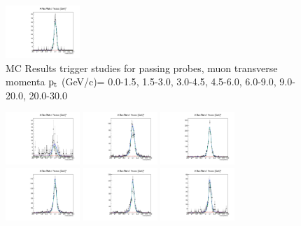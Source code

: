 \documentclass{article}
\begin{document}
\begin{figure}
    \includegraphics[width=0.25\textwidth]{../PlotsRooFitMC/croofit_trk_pass_6.pdf}
    \caption{MC Results trigger studies for passing probes, muon transverse momenta
    $\rm p_{t}$ (GeV/c)= {0.0-1.5}, {1.5-3.0}, {3.0-4.5}, {4.5-6.0}, 
    {6.0-9.0}, {9.0-20.0}, {20.0-30.0}}
\end{figure}

\begin{figure}
    \includegraphics[width=0.25\textwidth]{../PlotsRooFitMC/croofit_trk_fail_0.pdf}
    \includegraphics[width=0.25\textwidth]{../PlotsRooFitMC/croofit_trk_fail_1.pdf}
    \includegraphics[width=0.25\textwidth]{../PlotsRooFitMC/croofit_trk_fail_2.pdf}
    \includegraphics[width=0.25\textwidth]{../PlotsRooFitMC/croofit_trk_fail_3.pdf}
    \includegraphics[width=0.25\textwidth]{../PlotsRooFitMC/croofit_trk_fail_4.pdf}
    \includegraphics[width=0.25\textwidth]{../PlotsRooFitMC/croofit_trk_fail_5.pdf}

\end{figure}
\end{document}

